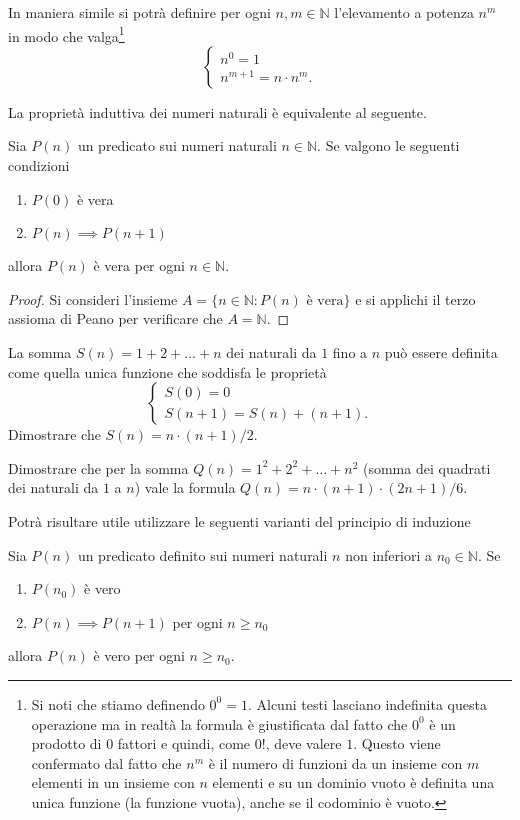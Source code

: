 \documentclass[italian,a4paper,hidelinks,headinclude]{scrartcl}
\newcommand{\NN}{{\mathbb N}}
\begin{document}
In maniera simile si potrà definire per ogni $n,m \in \NN$ l'elevamento a potenza $n^m$
in modo che valga\footnote{%
Si noti che stiamo definendo $0^0=1$.
Alcuni testi lasciano indefinita questa operazione ma in realtà la formula
è giustificata dal fatto che $0^0$ è un prodotto di $0$ fattori e quindi,
come $0!$, deve valere $1$.
Questo viene confermato dal fatto che $n^m$ è il numero di funzioni da un
insieme con $m$ elementi in un insieme con $n$ elementi e
su un dominio vuoto è definita una unica funzione (la funzione vuota), anche
se il codominio è vuoto.
}
\[
\begin{cases}
  n^0 = 1\\
  n^{m+1} = n\cdot n^m.
\end{cases}
\]

La proprietà induttiva dei numeri naturali è equivalente al seguente.
\begin{theorem}
Sia $P(n)$ un predicato sui numeri naturali $n\in \NN$.
Se valgono le seguenti condizioni
\begin{enumerate}
\item $P(0)$ è vera
\item $P(n) \implies P(n+1)$
\end{enumerate}
allora $P(n)$ è vera per ogni $n\in \NN$.
\end{theorem}
%
\begin{proof}
Si consideri l'insieme $A=\{n\in \NN\colon \text{$P(n)$ è vera}\}$ e si
applichi il terzo assioma di Peano per verificare che $A=\NN$.
\end{proof}


\begin{exercise}
La somma $S(n) = 1 + 2 + \dots +n$
dei naturali da $1$ fino a $n$ può essere definita come quella unica funzione
che soddisfa le proprietà
\[
\begin{cases}
  S(0) = 0 \\
  S(n+1) = S(n) + (n+1).
\end{cases}
\]
Dimostrare che $S(n) = n \cdot (n+1) / 2$.
\end{exercise}

\begin{exercise}
Dimostrare che per la somma
$Q(n) = 1^2 + 2^2 + \dots + n^2$
(somma dei quadrati dei naturali da $1$ a $n$)
vale la formula
$Q(n) = n \cdot (n+1)\cdot (2n + 1) / 6$.
\end{exercise}

Potrà risultare utile utilizzare le seguenti varianti del principio di
induzione
\begin{theorem}
Sia $P(n)$ un predicato definito sui numeri naturali $n$
non inferiori a $n_0\in \NN$.
Se
\begin{enumerate}
\item $P(n_0)$ è vero
\item $P(n) \implies P(n+1)$ per ogni $n\ge n_0$
\end{enumerate}
allora $P(n)$ è vero per ogni $n\ge n_0$.
\end{theorem}
\end{document}
